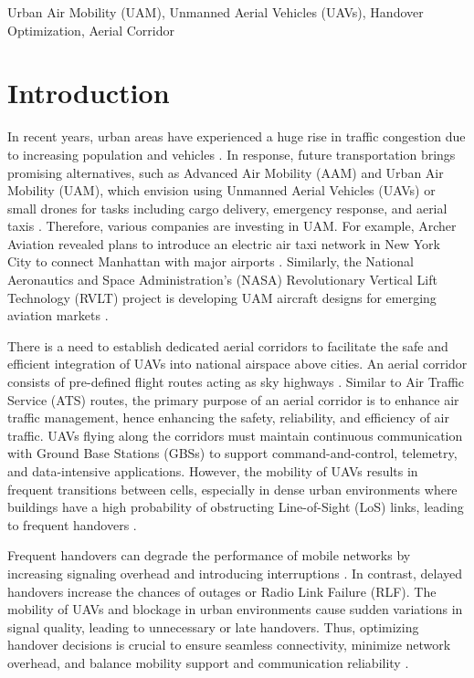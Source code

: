 \documentclass[conference]{IEEEtran}
\begin{document}
\begin{IEEEkeywords}
Urban Air Mobility (UAM), Unmanned
Aerial Vehicles (UAVs), Handover Optimization, Aerial Corridor
\end{IEEEkeywords}



\section{Introduction}
In recent years, urban areas have experienced a huge rise in traffic congestion due to increasing population and vehicles \cite{10718279}. In response, future transportation brings promising alternatives, such as Advanced Air Mobility (AAM) and Urban Air Mobility (UAM), which envision using Unmanned Aerial Vehicles (UAVs) or small drones for tasks including cargo delivery, emergency response, and aerial taxis \cite{cohen2021urban, 10793277}. Therefore, various companies are investing in UAM. For example, Archer Aviation revealed plans to introduce an electric air taxi network in New York City to connect Manhattan with major airports \cite{archer2025nyc}. Similarly, the National Aeronautics and Space Administration’s (NASA) Revolutionary Vertical Lift Technology (RVLT) project is developing UAM aircraft designs for emerging aviation markets \cite{johnson2022nasa}.

There is a need to establish dedicated aerial corridors to facilitate the safe and efficient integration of UAVs into national airspace above cities. An aerial corridor consists of pre-defined flight routes acting as sky highways \cite{10594734}. Similar to Air Traffic Service (ATS) routes, the primary purpose of an aerial corridor is to enhance air traffic management, hence enhancing the safety, reliability, and efficiency of air traffic. UAVs flying along the corridors must maintain continuous communication with Ground Base Stations (GBSs) to support command-and-control, telemetry, and data-intensive applications. However, the mobility of UAVs results in frequent transitions between cells, especially in dense urban environments where buildings have a high probability of obstructing Line-of-Sight (LoS) links, leading to frequent handovers \cite{10746345}.

Frequent handovers can degrade the performance of mobile networks by increasing signaling overhead and introducing interruptions \cite{sonmez2024handover}. In contrast, delayed handovers increase the chances of outages or Radio Link Failure (RLF). The mobility of UAVs and blockage in urban environments cause sudden variations in signal quality, leading to unnecessary or late handovers. Thus, optimizing handover decisions is crucial to ensure seamless connectivity, minimize network overhead, and balance mobility support and communication reliability \cite{ullah2023survey}. 
\end{document}
